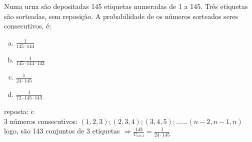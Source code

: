 \begin{ex}
 	Numa urna são depositadas 145 etiquetas numeradas de 1 a 145. Três etiquetas são sorteadas, sem reposição. A probabilidade de os números sorteados seres consecutivos, é:
    \begin{enumerate}[(a)]
    \item $\frac{1}{145\cdot144}$
    \item $\frac{1}{145\cdot144\cdot143}$
    \item $\frac{1}{24\cdot145}$
    \item $\frac{1}{72\cdot145\cdot143}$
    \end{enumerate}
      \begin{sol}
       reposta: c \\
       3 números consecutivos: $(1, 2, 3);  (2, 3, 4);  (3, 4, 5); ......(n-2, n-1, n)$ \\ logo, são 143 conjuntos de 3 etiquetas 
       $\Longrightarrow\frac{143}{\mathrm{C}_{{10},3}}=\frac{1}{24\cdot145}$
      \end{sol}
\end{ex}